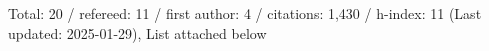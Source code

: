 Total: 20 / refereed: 11 / first author: 4 / citations: 1,430 / h-index: 11 (Last updated: 2025-01-29), List attached below
